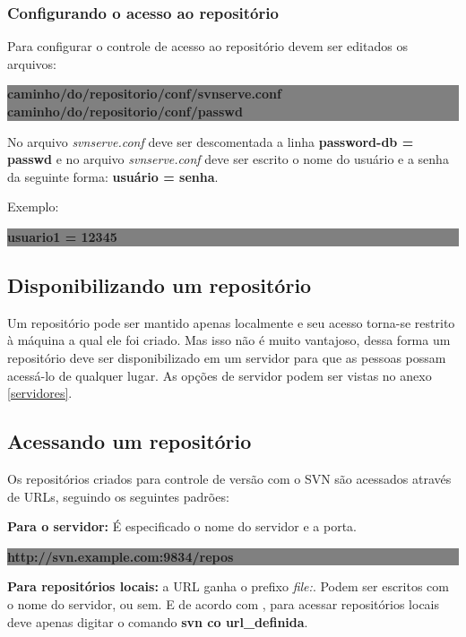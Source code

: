 \subsubsection{Configurando o acesso ao repositório}
\label{secao_acesso}
Para configurar o controle de acesso ao repositório devem ser editados os arquivos: \cite{wiki-svn}

\begin{centering}
\colorbox{Gray}{
\begin{minipage}{250px}
  \textbf{caminho/do/repositorio/conf/svnserve.conf}
  \textbf{caminho/do/repositorio/conf/passwd}
\end{minipage}
}
\end{centering}

No arquivo \textit{svnserve.conf} deve ser descomentada a linha \textbf{password-db = passwd} e no arquivo \textit{svnserve.conf}
deve ser escrito o nome do usuário e a senha da seguinte forma: \textbf{usuário = senha}. \cite{wiki-svn}

\begin{centering}
Exemplo:

\colorbox{Gray}{
\begin{minipage}{100px}

  \textbf{usuario1 = 12345}
\end{minipage}
}
\end{centering}

\subsection{Disponibilizando um repositório}

Um repositório pode ser mantido apenas localmente e seu acesso torna-se restrito à máquina a qual ele foi criado. Mas isso não é muito vantajoso, dessa forma um repositório deve ser disponibilizado em um servidor para que as pessoas possam acessá-lo de qualquer lugar. As opções de servidor podem ser vistas no anexo \ref{servidores}.

\subsection{Acessando um repositório}

  Os repositórios criados para controle de versão com o SVN são acessados através de URLs, seguindo os seguintes padrões: \cite{svn-book}

\begin{centering}

\textbf{Para o servidor:} É especificado o nome do servidor e a porta.

\colorbox{Gray}{
\begin{minipage}{220px}
  \textbf{http://svn.example.com:9834/repos}
\end{minipage}
}

\textbf{Para repositórios locais:} a URL ganha o prefixo \textit{file:}. Podem ser escritos com o nome do servidor, ou sem. E de acordo com , para acessar repositórios locais deve apenas digitar o comando \textbf{svn co url\_definida}.
\end{centering}

